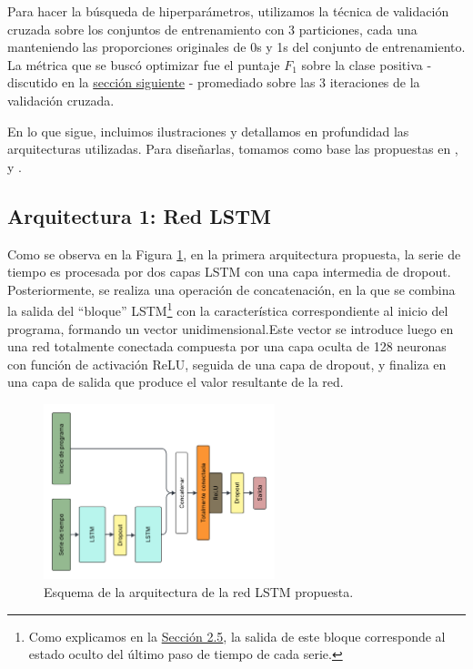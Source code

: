 \documentclass[../../main.tex]{subfiles}
\begin{document}
Para hacer la búsqueda de hiperparámetros, utilizamos la técnica de validación cruzada
sobre los conjuntos de entrenamiento con 3 particiones, cada una manteniendo las
proporciones originales de 0s y 1s del conjunto de entrenamiento. La métrica que se buscó
optimizar fue el puntaje \(F_1\) sobre la clase positiva - discutido en la
\hyperref[sec:metricas]{sección siguiente}  - promediado sobre las 3 iteraciones de la
validación cruzada.

En lo que sigue, incluimos ilustraciones y detallamos en profundidad las arquitecturas
utilizadas. Para diseñarlas, tomamos como base las propuestas en
\cite{wang2016timeseriesclassificationscratch}, \cite{Karim_2018} y
\cite{timeseriesclass-with-rnn}.

\subsection{Arquitectura 1: Red LSTM}
Como se observa en la Figura \ref{fig:lstm_v2}, en la primera arquitectura propuesta, la
serie de tiempo es procesada por dos capas LSTM con una capa intermedia de dropout.
Posteriormente, se realiza una operación de concatenación, en la que se combina la salida
del ``bloque'' LSTM\footnote{Como explicamos en la \hyperref[sec:recurrentes]{Sección
2.5}, la salida de este bloque corresponde al estado oculto del último paso de tiempo de
cada serie.} con la característica correspondiente al inicio del programa, formando un
vector unidimensional.Este vector se introduce luego en una red totalmente conectada
compuesta por una capa oculta de 128 neuronas con función de activación ReLU, seguida de
una capa de dropout, y finaliza en una capa de salida que produce el valor resultante de
la red.
\begin{figure}[ht]
    \centering
    \includegraphics[width=0.6\textwidth]{figs/lstm_v2.png}
    \caption{Esquema de la arquitectura de la red LSTM propuesta.}
    \label{fig:lstm_v2}
\end{figure}
\end{document}
